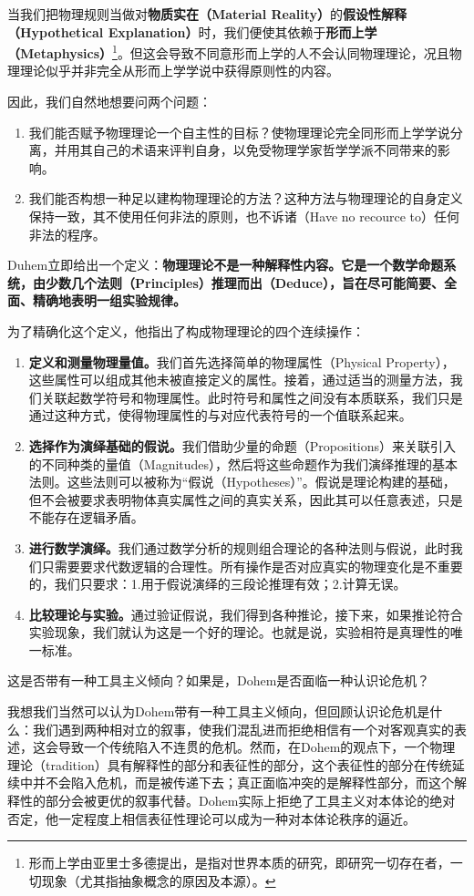 \documentclass[12pt, a4paper, oneside]{ctexart}
\renewcommand{\b}{\textbf}
\newcommand{\f}{\footnote}
\newcommand{\q}[1]{\begin{questionbox}{}#1\end{questionbox}}
\newcommand{\ans}[1]{\begin{ansbox}{}#1\end{ansbox}}
\newcounter{question}[section]
\newcounter{ans}[section]
\begin{document}
当我们把物理规则当做对\b{物质实在（Material Reality）}的\b{假设性解释（Hypothetical Explanation）}时，我们便使其依赖于\b{形而上学（Metaphysics）}\f{形而上学由亚里士多德提出，是指对世界本质的研究，即研究一切存在者，一切现象（尤其指抽象概念的原因及本源）。}。但这会导致不同意形而上学的人不会认同物理理论，况且物理理论似乎并非完全从形而上学学说中获得原则性的内容。

因此，我们自然地想要问两个问题：
\begin{enumerate}
    \item 我们能否赋予物理理论一个自主性的目标？使物理理论完全同形而上学学说分离，并用其自己的术语来评判自身，以免受物理学家哲学学派不同带来的影响。
    \item 我们能否构想一种足以建构物理理论的方法？这种方法与物理理论的自身定义保持一致，其不使用任何非法的原则，也不诉诸（Have no recource to）任何非法的程序。
\end{enumerate}
Duhem立即给出一个定义：\b{物理理论不是一种解释性内容。它是一个数学命题系统，由少数几个法则（Principles）推理而出（Deduce），旨在尽可能简要、全面、精确地表明一组实验规律。}

为了精确化这个定义，他指出了构成物理理论的四个连续操作：
\begin{enumerate}
    \item \b{定义和测量物理量值。}我们首先选择简单的物理属性（Physical Property），这些属性可以组成其他未被直接定义的属性。接着，通过适当的测量方法，我们关联起数学符号和物理属性。此时符号和属性之间没有本质联系，我们只是通过这种方式，使得物理属性的与对应代表符号的一个值联系起来。
    \item \b{选择作为演绎基础的假说。}我们借助少量的命题（Propositions）来关联引入的不同种类的量值（Magnitudes），然后将这些命题作为我们演绎推理的基本法则。这些法则可以被称为“假说（Hypotheses）”。假说是理论构建的基础，但不会被要求表明物体真实属性之间的真实关系，因此其可以任意表述，只是不能存在逻辑矛盾。
    \item \b{进行数学演绎。}我们通过数学分析的规则组合理论的各种法则与假说，此时我们只需要要求代数逻辑的合理性。所有操作是否对应真实的物理变化是不重要的，我们只要求：1.用于假说演绎的三段论推理有效；2.计算无误。
    \item \b{比较理论与实验。}通过验证假说，我们得到各种推论，接下来，如果推论符合实验现象，我们就认为这是一个好的理论。也就是说，实验相符是真理性的唯一标准。
\end{enumerate}

\q{这是否带有一种工具主义倾向？如果是，Dohem是否面临一种认识论危机？}
\ans{我想我们当然可以认为Dohem带有一种工具主义倾向，但回顾认识论危机是什么：我们遇到两种相对立的叙事，使我们混乱进而拒绝相信有一个对客观真实的表述，这会导致一个传统陷入不连贯的危机。然而，在Dohem的观点下，一个物理理论（tradition）具有解释性的部分和表征性的部分，这个表征性的部分在传统延续中并不会陷入危机，而是被传递下去；真正面临冲突的是解释性部分，而这个解释性的部分会被更优的叙事代替。Dohem实际上拒绝了工具主义对本体论的绝对否定，他一定程度上相信表征性理论可以成为一种对本体论秩序的逼近。}
\end{document}
